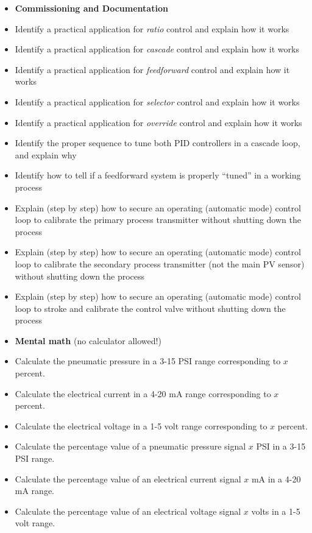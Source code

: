 \begin{itemize}
\item{} {\bf Commissioning and Documentation}
\item{} Identify a practical application for {\it ratio} control and explain how it works
\item{} Identify a practical application for {\it cascade} control and explain how it works
\item{} Identify a practical application for {\it feedforward} control and explain how it works
\item{} Identify a practical application for {\it selector} control and explain how it works
\item{} Identify a practical application for {\it override} control and explain how it works
\item{} Identify the proper sequence to tune both PID controllers in a cascade loop, and explain why
\item{} Identify how to tell if a feedforward system is properly ``tuned'' in a working process
\item{} Explain (step by step) how to secure an operating (automatic mode) control loop to calibrate the primary process transmitter without shutting down the process
\item{} Explain (step by step) how to secure an operating (automatic mode) control loop to calibrate the secondary process transmitter (not the main PV sensor) without shutting down the process
\item{} Explain (step by step) how to secure an operating (automatic mode) control loop to stroke and calibrate the control valve without shutting down the process
\end{itemize}

\filbreak

\begin{itemize}
\item{} {\bf Mental math} (no calculator allowed!)
\item{} Calculate the pneumatic pressure in a 3-15 PSI range corresponding to $x$ percent.
\item{} Calculate the electrical current in a 4-20 mA range corresponding to $x$ percent.
\item{} Calculate the electrical voltage in a 1-5 volt range corresponding to $x$ percent.
\item{} Calculate the percentage value of a pneumatic pressure signal $x$ PSI in a 3-15 PSI range.
\item{} Calculate the percentage value of an electrical current signal $x$ mA in a 4-20 mA range.
\item{} Calculate the percentage value of an electrical voltage signal $x$ volts in a 1-5 volt range.
\end{itemize}

